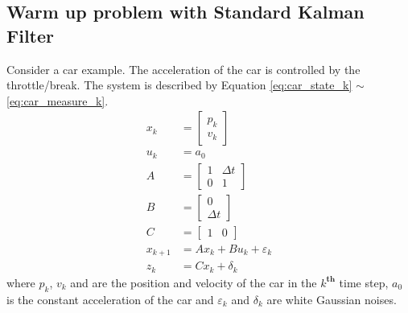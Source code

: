 \documentclass[11pt,a4paper]{article}
\begin{document}
\subsection{Warm up problem with Standard Kalman Filter}
\label{sec:standard_kf}
\par Consider a car example. The acceleration of the car is controlled by the throttle/break. The system is described by Equation \ref{eq:car_state_k} $\sim$ \ref{eq:car_measure_k}.
	\begin{align}
		x_{k} &= \begin{bmatrix} p_{k} \\ v_{k} \end{bmatrix} \label{eq:car_state_k} \\
		u_{k} &= a_{0} \label{eq:car_control_k} \\
		A &= \begin{bmatrix} 1 & \Delta t \\ 0 & 1 \end{bmatrix} \label{eq:car_factor_previous} \\
		B &= \begin{bmatrix} 0 \\ \Delta t \end{bmatrix} \label{eq:car_factor_control} \\
		C &= \begin{bmatrix} 1 & 0 \end{bmatrix} \label{eq:car_factor_measure} \\
		x_{k+1} &= Ax_{k} + Bu_{k} + \varepsilon_{k} \label{eq:car_predict_k+1} \\
		z_{k} &= Cx_{k} + \delta_{k} \label{eq:car_measure_k}
	\end{align}
where $p_{k}$, $v_{k}$ and are the position and velocity of the car in the $k^{\mathbf{th}}$ time step, $a_{0}$ is the constant acceleration of the car and $\varepsilon_{k}$ and $\delta_{k}$ are white Gaussian noises.
\end{document}
